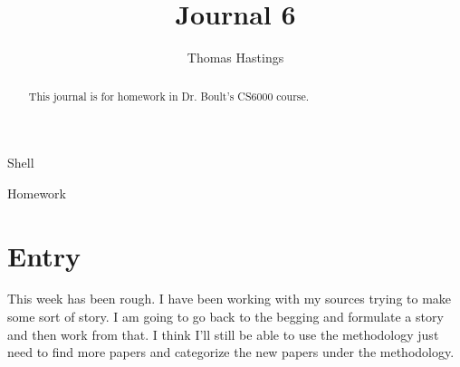 \documentclass[journal]{IEEEtran}
\begin{document}
  \title{Journal 6}
  \author{Thomas Hastings}%
  
  {Shell}
  \maketitle
  
  \begin{abstract}
  This journal is for homework in Dr. Boult's CS6000 course.
  \end{abstract}
  
  \begin{IEEEkeywords}
  Homework
  \end{IEEEkeywords}
  
  
  \section{Entry}
  This week has been rough. I have been working with my sources trying to make some sort of story. I am going to go back to the begging and formulate a story and then work from that. I think I'll still be able to use the methodology just need to find more papers and categorize the new papers under the methodology. 
  
  

  
  
\end{document}
